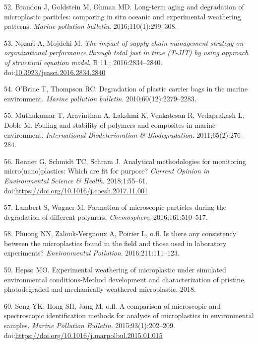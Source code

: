 \documentclass[icelandic,]{book}
\begin{document}
\leavevmode\hypertarget{ref-brandon2016long}{}%
52. Brandon J, Goldstein M, Ohman MD. Long-term aging and degradation of microplastic particles: comparing in situ oceanic and experimental weathering patterns. \emph{Marine pollution bulletin}. 2016;110(1):299--308.

\leavevmode\hypertarget{ref-Nozari2016}{}%
53. Nozari A, Mojdehi M. \emph{The impact of supply chain management strategy on organizational performance through total just in time (T-JIT) by using approach of structural equation model}. B 11.; 2016:2834--2840. doi:\href{https://doi.org/10.3923/jeasci.2016.2834.2840}{10.3923/jeasci.2016.2834.2840}

\leavevmode\hypertarget{ref-o2010degradation}{}%
54. O'Brine T, Thompson RC. Degradation of plastic carrier bags in the marine environment. \emph{Marine pollution bulletin}. 2010;60(12):2279--2283.

\leavevmode\hypertarget{ref-muthukumar2011fouling}{}%
55. Muthukumar T, Aravinthan A, Lakshmi K, Venkatesan R, Vedaprakash L, Doble M. Fouling and stability of polymers and composites in marine environment. \emph{International Biodeterioration \& Biodegradation}. 2011;65(2):276--284.

\leavevmode\hypertarget{ref-RENNER201855}{}%
56. Renner G, Schmidt TC, Schram J. Analytical methodologies for monitoring micro(nano)plastics: Which are fit for purpose? \emph{Current Opinion in Environmental Science \& Health}. 2018;1:55--61. doi:\href{https://doi.org/https://doi.org/10.1016/j.coesh.2017.11.001}{https://doi.org/10.1016/j.coesh.2017.11.001}

\leavevmode\hypertarget{ref-lambert2016formation}{}%
57. Lambert S, Wagner M. Formation of microscopic particles during the degradation of different polymers. \emph{Chemosphere}. 2016;161:510--517.

\leavevmode\hypertarget{ref-phuong2016there}{}%
58. Phuong NN, Zalouk-Vergnoux A, Poirier L, o.fl. Is there any consistency between the microplastics found in the field and those used in laboratory experiments? \emph{Environmental Pollution}. 2016;211:111--123.

\leavevmode\hypertarget{ref-hepso2018experimental}{}%
59. Hepsø MO. Experimental weathering of microplastic under simulated environmental conditions-Method development and characterization of pristine, photodegraded and mechanically weathered microplastic. 2018.

\leavevmode\hypertarget{ref-SONG2015202}{}%
60. Song YK, Hong SH, Jang M, o.fl. A comparison of microscopic and spectroscopic identification methods for analysis of microplastics in environmental samples. \emph{Marine Pollution Bulletin}. 2015;93(1):202--209. doi:\href{https://doi.org/https://doi.org/10.1016/j.marpolbul.2015.01.015}{https://doi.org/10.1016/j.marpolbul.2015.01.015}
\end{document}
